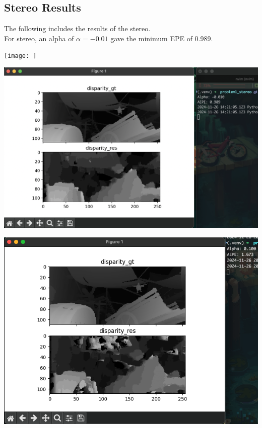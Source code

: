 \documentclass[12pt]{article}
\begin{document}

\subsection*{Stereo Results} The following includes the results of the stereo. \\ 
For stereo, an alpha of $\alpha = -0.01$ gave the minimum EPE of 0.989.

\texttt{[image: ]}
\begin{minipage}{0.49\textwidth}
    \centering
    \includegraphics[width=\textwidth]{./problem1_stereo/stereo_results.png}
\end{minipage}
\begin{minipage}{0.49\textwidth}
    \centering
    \includegraphics[width=\textwidth]{./problem1_stereo/alpha_0.1.png}
\end{minipage}
\end{document}
